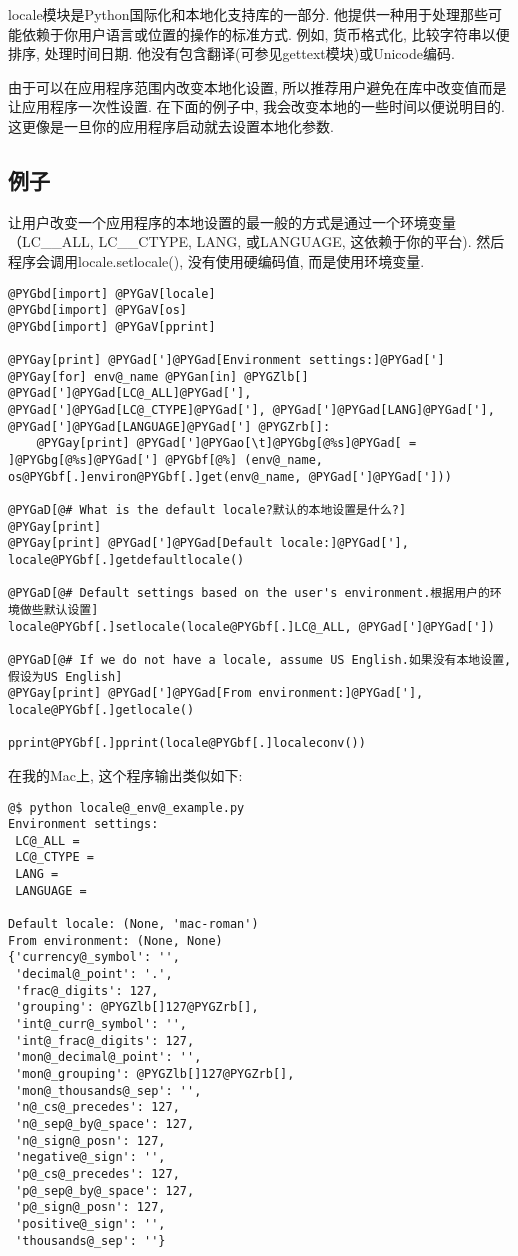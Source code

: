 \documentclass[letterpaper,10pt,english]{manual}
\begin{document}
locale模块是Python国际化和本地化支持库的一部分. 他提供一种用于处理那些可能依赖于你用户语言或位置的操作的标准方式. 例如, 货币格式化, 比较字符串以便排序, 处理时间日期. 他没有包含翻译(可参见gettext模块)或Unicode编码.

由于可以在应用程序范围内改变本地化设置, 所以推荐用户避免在库中改变值而是让应用程序一次性设置. 在下面的例子中, 我会改变本地的一些时间以便说明目的.这更像是一旦你的应用程序启动就去设置本地化参数.


\subsection{例子}

让用户改变一个应用程序的本地设置的最一般的方式是通过一个环境变量（LC\_\_ALL, LC\_\_CTYPE, LANG, 或LANGUAGE, 这依赖于你的平台). 然后程序会调用locale.setlocale(), 没有使用硬编码值, 而是使用环境变量.

\begin{Verbatim}[commandchars=@\[\]]
@PYGbd[import] @PYGaV[locale]
@PYGbd[import] @PYGaV[os]
@PYGbd[import] @PYGaV[pprint]

@PYGay[print] @PYGad[']@PYGad[Environment settings:]@PYGad[']
@PYGay[for] env@_name @PYGan[in] @PYGZlb[] @PYGad[']@PYGad[LC@_ALL]@PYGad['], @PYGad[']@PYGad[LC@_CTYPE]@PYGad['], @PYGad[']@PYGad[LANG]@PYGad['], @PYGad[']@PYGad[LANGUAGE]@PYGad['] @PYGZrb[]:
    @PYGay[print] @PYGad[']@PYGao[\t]@PYGbg[@%s]@PYGad[ = ]@PYGbg[@%s]@PYGad['] @PYGbf[@%] (env@_name, os@PYGbf[.]environ@PYGbf[.]get(env@_name, @PYGad[']@PYGad[']))

@PYGaD[@# What is the default locale?默认的本地设置是什么?]
@PYGay[print]
@PYGay[print] @PYGad[']@PYGad[Default locale:]@PYGad['], locale@PYGbf[.]getdefaultlocale()

@PYGaD[@# Default settings based on the user's environment.根据用户的环境做些默认设置]
locale@PYGbf[.]setlocale(locale@PYGbf[.]LC@_ALL, @PYGad[']@PYGad['])

@PYGaD[@# If we do not have a locale, assume US English.如果没有本地设置, 假设为US English]
@PYGay[print] @PYGad[']@PYGad[From environment:]@PYGad['], locale@PYGbf[.]getlocale()

pprint@PYGbf[.]pprint(locale@PYGbf[.]localeconv())
\end{Verbatim}

在我的Mac上, 这个程序输出类似如下:

\begin{Verbatim}[commandchars=@\[\]]
@$ python locale@_env@_example.py
Environment settings:
 LC@_ALL =
 LC@_CTYPE =
 LANG =
 LANGUAGE =

Default locale: (None, 'mac-roman')
From environment: (None, None)
{'currency@_symbol': '',
 'decimal@_point': '.',
 'frac@_digits': 127,
 'grouping': @PYGZlb[]127@PYGZrb[],
 'int@_curr@_symbol': '',
 'int@_frac@_digits': 127,
 'mon@_decimal@_point': '',
 'mon@_grouping': @PYGZlb[]127@PYGZrb[],
 'mon@_thousands@_sep': '',
 'n@_cs@_precedes': 127,
 'n@_sep@_by@_space': 127,
 'n@_sign@_posn': 127,
 'negative@_sign': '',
 'p@_cs@_precedes': 127,
 'p@_sep@_by@_space': 127,
 'p@_sign@_posn': 127,
 'positive@_sign': '',
 'thousands@_sep': ''}
\end{Verbatim}
\end{document}
